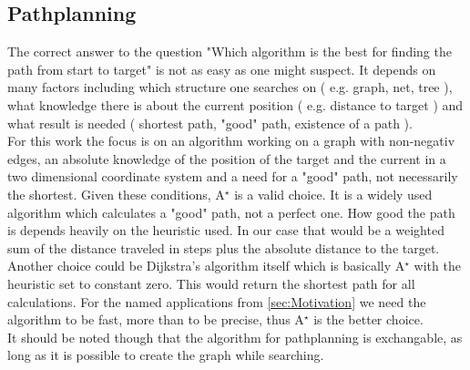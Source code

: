 \subsection{Pathplanning}
The correct answer to the question "Which algorithm is the best for finding the path from start to target" is not as easy as one might suspect. 
It depends on many factors including which structure one searches on ( e.g. graph, net, tree ), what knowledge there is about the current position ( e.g. distance to target ) and what result is needed ( shortest path, "good" path, existence of a path ).\\
For this work the focus is on an algorithm working on a graph with non-negativ edges, an absolute knowledge of the position of the target and the current in a two dimensional coordinate system and a need for a "good" path, not necessarily the shortest. Given these conditions, A$^\star$ is a valid choice. It is a widely used algorithm which calculates a "good" path, not a perfect one. How good the path is depends heavily on the heuristic used. In our case that would be a weighted sum of the distance traveled in steps plus the absolute distance to the target.\\
Another choice could be Dijkstra's algorithm \cite{ComputerScience} itself which is basically A$^\star$ with the heuristic set to constant zero. This would return the shortest path for all calculations. For the named applications from \ref{sec:Motivation} we need the algorithm to be fast, more than to be precise, thus A$^\star$ is the better choice.\\
It should be noted though that the algorithm for pathplanning is exchangable, as long as it is possible to create the graph while searching.

